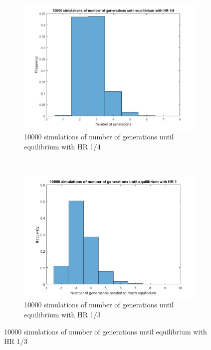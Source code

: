 \documentclass{article}
\begin{document}
\begin{figure}[ht]
    \centering
    \begin{subfigure}[t]{0.4\textwidth}
        \includegraphics[width=\textwidth]{GenormHistogramAantalgen4}
        \caption{10000 simulations of number of generations until equilibrium with HR 1/4}
        \label{fig:gull}
    \end{subfigure}
    ~ %
    \begin{subfigure}[t]{0.4\textwidth}
        \includegraphics[width=\textwidth]{GenormHistogramAantalgen}
        \caption{10000 simulations of number of generations until equilibrium with HR 1/3}
        \label{fig:tiger}

\end{subfigure}
\end{figure}
\end{document}
